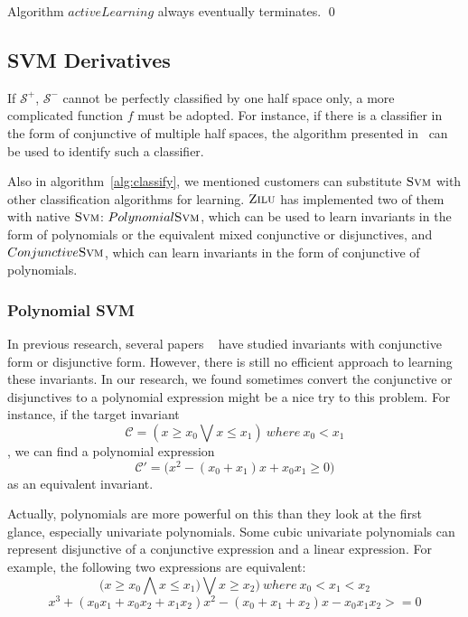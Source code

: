 \begin{example}
\end{example}

\begin{proposition}
Algorithm $activeLearning$ always eventually terminates. \hfill \qed
\end{proposition}


\subsection{SVM Derivatives}
If $\mathcal{S}^+$, $\mathcal{S}^-$ cannot be perfectly classified by one half space only, 
a more complicated function $f$ must be adopted. 
For instance, if there is a classifier in the form of conjunctive of multiple half spaces, 
the algorithm presented in~\cite{Sharma2012} can be used to identify such a classifier.

Also in algorithm~\ref{alg:classify}, we mentioned customers can substitute $\textsc{Svm}$ with other classification algorithms for learning.
$\textsc{Zilu}$ has implemented two of them with native $\textsc{Svm}$: 
$Polynomial \textsc{Svm}$, which can be used to learn invariants in the form of polynomials or the equivalent mixed conjunctive or disjunctives,
and $Conjunctive \textsc{Svm}$, which can learn invariants in the form of conjunctive of polynomials.

\subsubsection{Polynomial SVM}
In previous research, several papers ~\cite{**} have studied invariants with conjunctive form or disjunctive form.
However, there is still no efficient approach to learning these invariants.
In our research, we found sometimes convert the conjunctive or disjunctives to a polynomial expression might be a nice try to this problem.
For instance, if the target invariant 
$$\mathcal{C} = (x \ge x_0 \bigvee x \le x_1) \ where\ x_0 < x_1$$,
we can find a polynomial expression 
$$\mathcal{C}' = \big(x^2 - (x_0 + x_1)x + x_0x_1 \ge 0\big)$$ 
as an equivalent invariant.

Actually, polynomials are more powerful on this than they look at the first glance, especially univariate polynomials. 
Some cubic univariate polynomials can represent disjunctive of a conjunctive expression and a linear expression.
For example, the following two expressions are equivalent:
$$\big(x \ge x_0 \bigwedge x \le x_1) \bigvee x \ge x_2\big) \ where\ x_0 < x_1 < x_2$$
$$x^3 + (x_0x_1 + x_0x_2 + x_1x_2)x^2 - (x_0 + x_1 + x_2)x - x_0x_1x_2 >= 0$$ 


